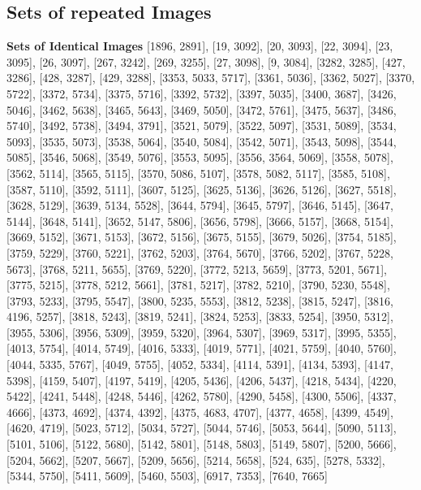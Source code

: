 \documentclass[letterpaper, 11pt]{IEEEtran}
\begin{document}
\subsection{Sets of repeated Images}\label{list_identical}
\noindent
\textbf{Sets of Identical Images}
[1896, 2891], [19, 3092], [20, 3093], [22, 3094], [23, 3095], [26, 3097], [267, 3242], [269, 3255], [27, 3098], [9, 3084], [3282, 3285], [427, 3286], [428, 3287], [429, 3288], [3353, 5033, 5717], [3361, 5036], [3362, 5027], [3370, 5722], [3372, 5734], [3375, 5716], [3392, 5732], [3397, 5035], [3400, 3687], [3426, 5046], [3462, 5638], [3465, 5643], [3469, 5050], [3472, 5761], [3475, 5637], [3486, 5740], [3492, 5738], [3494, 3791], [3521, 5079], [3522, 5097], [3531, 5089], [3534, 5093], [3535, 5073], [3538, 5064], [3540, 5084], [3542, 5071], [3543, 5098], [3544, 5085], [3546, 5068], [3549, 5076], [3553, 5095], [3556, 3564, 5069], [3558, 5078], [3562, 5114], [3565, 5115], [3570, 5086, 5107], [3578, 5082, 5117], [3585, 5108], [3587, 5110], [3592, 5111], [3607, 5125], [3625, 5136], [3626, 5126], [3627, 5518], [3628, 5129], [3639, 5134, 5528], [3644, 5794], [3645, 5797], [3646, 5145], [3647, 5144], [3648, 5141], [3652, 5147, 5806], [3656, 5798], [3666, 5157], [3668, 5154], [3669, 5152], [3671, 5153], [3672, 5156], [3675, 5155], [3679, 5026], [3754, 5185], [3759, 5229], [3760, 5221], [3762, 5203], [3764, 5670], [3766, 5202], [3767, 5228, 5673], [3768, 5211, 5655], [3769, 5220], [3772, 5213, 5659], [3773, 5201, 5671], [3775, 5215], [3778, 5212, 5661], [3781, 5217], [3782, 5210], [3790, 5230, 5548], [3793, 5233], [3795, 5547], [3800, 5235, 5553], [3812, 5238], [3815, 5247], [3816, 4196, 5257], [3818, 5243], [3819, 5241], [3824, 5253], [3833, 5254], [3950, 5312], [3955, 5306], [3956, 5309], [3959, 5320], [3964, 5307], [3969, 5317], [3995, 5355], [4013, 5754], [4014, 5749], [4016, 5333], [4019, 5771], [4021, 5759], [4040, 5760], [4044, 5335, 5767], [4049, 5755], [4052, 5334], [4114, 5391], [4134, 5393], [4147, 5398], [4159, 5407], [4197, 5419], [4205, 5436], [4206, 5437], [4218, 5434], [4220, 5422], [4241, 5448], [4248, 5446], [4262, 5780], [4290, 5458], [4300, 5506], [4337, 4666], [4373, 4692], [4374, 4392], [4375, 4683, 4707], [4377, 4658], [4399, 4549], [4620, 4719], [5023, 5712], [5034, 5727], [5044, 5746], [5053, 5644], [5090, 5113], [5101, 5106], [5122, 5680], [5142, 5801], [5148, 5803], [5149, 5807], [5200, 5666], [5204, 5662], [5207, 5667], [5209, 5656], [5214, 5658], [524, 635], [5278, 5332], [5344, 5750], [5411, 5609], [5460, 5503], [6917, 7353], [7640, 7665]
\end{document}
